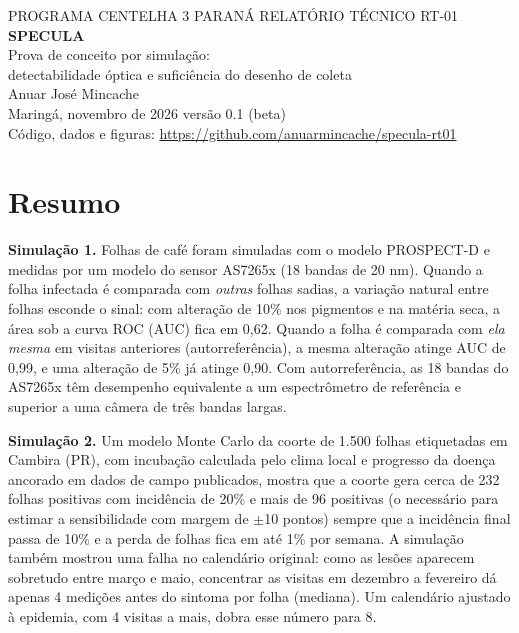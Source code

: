 \documentclass[11pt,a4paper]{article}
\begin{document}
\begin{center}
{\small PROGRAMA CENTELHA 3 PARANÁ \textbar{} RELATÓRIO TÉCNICO RT-01}\\[6pt]
{\LARGE\bfseries\color{verde} SPECULA}\\[4pt]
{\large Prova de conceito por simulação:\\ detectabilidade óptica e suficiência do desenho de coleta}\\[8pt]
Anuar José Mincache\\
Maringá, novembro de 2026 \textbar{} versão 0.1 (beta)\\[2pt]{\small Código, dados e figuras: \url{https://github.com/anuarmincache/specula-rt01}}
\end{center}

\begin{center}
\end{center}

\section*{Resumo}
\textbf{Simulação 1.} Folhas de café foram simuladas com o modelo PROSPECT-D e medidas por um modelo do sensor AS7265x (18 bandas de 20 nm). Quando a folha infectada é comparada com \emph{outras} folhas sadias, a variação natural entre folhas esconde o sinal: com alteração de 10\% nos pigmentos e na matéria seca, a área sob a curva ROC (AUC) fica em 0,62. Quando a folha é comparada com \emph{ela mesma} em visitas anteriores (autorreferência), a mesma alteração atinge AUC de 0,99, e uma alteração de 5\% já atinge 0,90. Com autorreferência, as 18 bandas do AS7265x têm desempenho equivalente a um espectrômetro de referência e superior a uma câmera de três bandas largas.

\textbf{Simulação 2.} Um modelo Monte Carlo da coorte de 1.500 folhas etiquetadas em Cambira (PR), com incubação calculada pelo clima local e progresso da doença ancorado em dados de campo publicados, mostra que a coorte gera cerca de 232 folhas positivas com incidência de 20\% e mais de 96 positivas (o necessário para estimar a sensibilidade com margem de $\pm$10 pontos) sempre que a incidência final passa de 10\% e a perda de folhas fica em até 1\% por semana. A simulação também mostrou uma falha no calendário original: como as lesões aparecem sobretudo entre março e maio, concentrar as visitas em dezembro a fevereiro dá apenas 4 medições antes do sintoma por folha (mediana). Um calendário ajustado à epidemia, com 4 visitas a mais, dobra esse número para 8.
\end{document}
